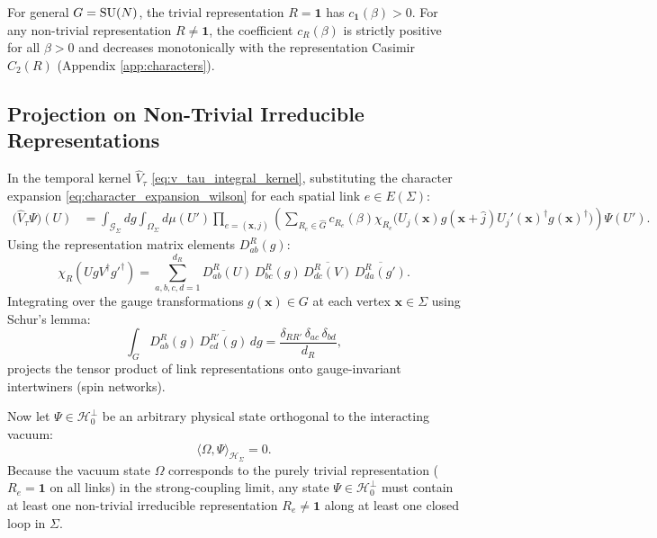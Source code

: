 For general $G = \mathrm{SU}(N)$, the trivial representation $R = \mathbf{1}$ has $c_{\mathbf{1}}(\beta) > 0$. For any non-trivial representation $R \neq \mathbf{1}$, the coefficient $c_R(\beta)$ is strictly positive for all $\beta > 0$ and decreases monotonically with the representation Casimir $C_2(R)$ (Appendix \ref{app:characters}).

\subsection{Projection on Non-Trivial Irreducible Representations}
\label{subsec:projection_nontrivial}

In the temporal kernel $\hat{V}_\tau$ \eqref{eq:v_tau_integral_kernel}, substituting the character expansion \eqref{eq:character_expansion_wilson} for each spatial link $e \in E(\Sigma)$:
\begin{align}
\label{eq:v_tau_expanded}
\bigl( \hat{V}_\tau \Psi \bigr)(U) &= \int_{\mathcal{G}_\Sigma} dg \int_{\Omega_\Sigma} d\mu(U') \prod_{e = (\mathbf{x}, j)} \left( \sum_{R_e \in \widehat{G}} c_{R_e}(\beta) \chi_{R_e}\bigl( U_j(\mathbf{x}) g(\mathbf{x}+\hat{j}) U_j'(\mathbf{x})^\dagger g(\mathbf{x})^\dagger \bigr) \right) \Psi(U').
\end{align}
Using the representation matrix elements $D_{ab}^R(g)$:
\begin{equation}
\chi_R(U g V^\dagger g'^\dagger) = \sum_{a, b, c, d=1}^{d_R} D_{ab}^R(U) \, D_{bc}^R(g) \, \overline{D_{dc}^R(V)} \, \overline{D_{da}^R(g')}.
\end{equation}
Integrating over the gauge transformations $g(\mathbf{x}) \in G$ at each vertex $\mathbf{x} \in \Sigma$ using Schur's lemma:
\begin{equation}
\int_G D_{ab}^R(g) \, \overline{D_{cd}^{R'}(g)} \, dg = \frac{\delta_{R R'} \, \delta_{ac} \, \delta_{bd}}{d_R},
\end{equation}
projects the tensor product of link representations onto gauge-invariant intertwiners (spin networks).

Now let $\Psi \in \mathcal{H}_0^\perp$ be an arbitrary physical state orthogonal to the interacting vacuum:
\begin{equation}
\langle \Omega, \Psi \rangle_{\mathcal{H}_\Sigma} = 0.
\end{equation}
Because the vacuum state $\Omega$ corresponds to the purely trivial representation ($R_e = \mathbf{1}$ on all links) in the strong-coupling limit, any state $\Psi \in \mathcal{H}_0^\perp$ must contain at least one non-trivial irreducible representation $R_e \neq \mathbf{1}$ along at least one closed loop in $\Sigma$.

